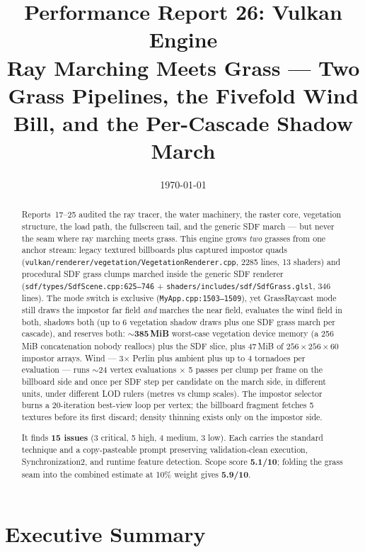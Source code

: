 \documentclass[11pt,a4paper]{article}
\title{Performance Report 26: Vulkan Engine \\
\large Ray Marching Meets Grass --- Two Grass Pipelines, the Fivefold Wind Bill, and the Per-Cascade Shadow March}
\author{}
\date{\today}
\begin{document}
\maketitle

\begin{abstract}
Reports~17--25 audited the ray tracer, the water machinery, the raster core,
vegetation structure, the load path, the fullscreen tail, and the generic SDF
march --- but never the seam where ray marching meets grass. This engine grows
\emph{two} grasses from one anchor stream: legacy textured billboards plus
captured impostor quads (\texttt{vulkan/renderer/vegetation/VegetationRenderer.cpp},
2285 lines, 13 shaders) and procedural SDF grass clumps marched inside the
generic SDF renderer (\texttt{sdf/types/SdfScene.cpp:625--746} +
\texttt{shaders/includes/sdf/SdfGrass.glsl}, 346 lines). The mode switch is
exclusive (\texttt{MyApp.cpp:1503--1509}), yet GrassRaycast mode still draws
the impostor far field \emph{and} marches the near field, evaluates the wind
field in both, shadows both (up to 6 vegetation shadow draws plus one SDF
grass march per cascade), and reserves both: \textbf{$\sim$385\,MiB}
worst-case vegetation device memory (a 256\,MiB concatenation nobody
reallocs) plus the SDF slice, plus 47\,MiB of $256\times256\times60$
impostor arrays. Wind --- 3$\times$ Perlin plus ambient plus up to 4 tornadoes
per evaluation --- runs $\sim$24 vertex evaluations $\times$ 5 passes per
clump per frame on the billboard side and once per SDF step per candidate on
the march side, in different units, under different LOD rulers
(metres vs clump scales). The impostor selector burns a 20-iteration
best-view loop per vertex; the billboard fragment fetches 5 textures before
its first discard; density thinning exists only on the impostor side.

It finds \textbf{15 issues} (3 critical, 5 high, 4 medium, 3 low). Each
carries the standard technique and a copy-pasteable prompt preserving
validation-clean execution, Synchronization2, and runtime feature detection.
Scope score \textbf{5.1/10}; folding the grass seam into the combined estimate
at 10\% weight gives \textbf{5.9/10}.
\end{abstract}

\tableofcontents
\newpage

\section{Executive Summary}
\end{document}
